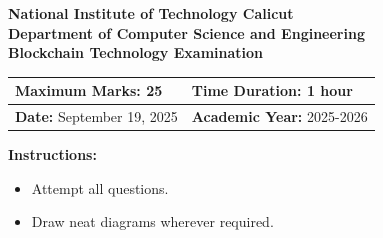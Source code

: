\documentclass[11pt,a4paper]{exam}
\newcommand{\examdate}{September 19, 2025}
\newcommand{\maxmarks}{25}
\newcommand{\timeduration}{1 hour}
\begin{document}
\begin{center}
\large \textbf{National Institute of Technology Calicut} \\
\large \textbf{Department of Computer Science and Engineering} \\
\vspace{0.3cm}
\Large \textbf{Blockchain Technology Examination} \\
\vspace{0.3cm}
\normalsize
\begin{tabular}{|p{}|p{}|}
\hline
\textbf{Maximum Marks:} \maxmarks & \textbf{Time Duration:} \timeduration \\
\hline
\textbf{Date:} \examdate & \textbf{Academic Year:} 2025-2026 \\
\hline
\end{tabular}
\end{center}

\vspace{0.3cm}
\textbf{Instructions:}
\begin{itemize}
\item Attempt all questions.
\item Draw neat diagrams wherever required.
\end{itemize}
\end{document}
